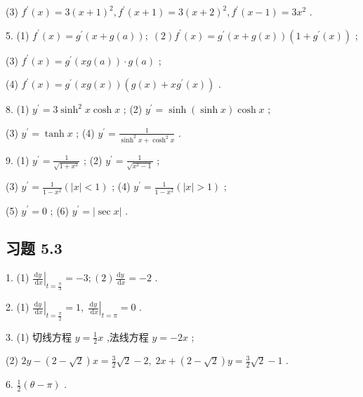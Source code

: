 (3) \({f}^{\prime }\left( x\right)  = 3{\left( x + 1\right) }^{2},{f}^{\prime }\left( {x + 1}\right)  = 3{\left( x + 2\right) }^{2},{f}^{\prime }\left( {x - 1}\right)  = 3{x}^{2}\) .

5. (1) \({f}^{\prime }\left( x\right)  = {g}^{\prime }\left( {x + g\left( a\right) }\right) ;\;\left( 2\right) {f}^{\prime }\left( x\right)  = {g}^{\prime }\left( {x + g\left( x\right) }\right) \left( {1 + {g}^{\prime }\left( x\right) }\right)\) ;

(3) \({f}^{\prime }\left( x\right)  = {g}^{\prime }\left( {{xg}\left( a\right) }\right)  \cdot  g\left( a\right)\) ;

(4) \({f}^{\prime }\left( x\right)  = {g}^{\prime }\left( {{xg}\left( x\right) }\right) \left( {g\left( x\right)  + x{g}^{\prime }\left( x\right) }\right)\) .

8. (1) \({y}^{\prime } = 3{\sinh }^{2}x\cosh x\) ; (2) \({y}^{\prime } = \sinh \left( {\sinh x}\right) \cosh x\) ;

(3) \({y}^{\prime } = \tanh x\) ; (4) \({y}^{\prime } = \frac{1}{{\sinh }^{2}x + {\cosh }^{2}x}\) .

9. (1) \({y}^{\prime } = \frac{1}{\sqrt{1 + {x}^{2}}}\) ; (2) \({y}^{\prime } = \frac{1}{\sqrt{{x}^{2} - 1}}\) ;

(3) \({y}^{\prime } = \frac{1}{1 - {x}^{2}}\left( {\left| x\right|  < 1}\right)\) ; (4) \({y}^{\prime } = \frac{1}{1 - {x}^{2}}\left( {\left| x\right|  > 1}\right)\) ;

(5) \({y}^{\prime } = 0\) ; (6) \({y}^{\prime } = \left| {\sec x}\right|\) .

\subsection{习题 5.3}

1. (1) \({\left. \frac{\mathrm{d}y}{\mathrm{\;d}x}\right| }_{t = \frac{\pi }{3}} =  - 3;\left( 2\right) \frac{\mathrm{d}y}{\mathrm{\;d}x} =  - 2\) .

2. (1) \({\left. \frac{\mathrm{d}y}{\mathrm{\;d}x}\right| }_{t = \frac{\pi }{2}} = 1,{\left. \;\frac{\mathrm{d}y}{\mathrm{\;d}x}\right| }_{t = \pi } = 0\) .

3. (1) 切线方程 \(y = \frac{1}{2}x\) ,法线方程 \(y =  - {2x}\) ;

(2) \({2y} - \left( {2 - \sqrt{2}}\right) x = \frac{3}{2}\sqrt{2} - 2,\;{2x} + \left( {2 - \sqrt{2}}\right) y = \frac{3}{2}\sqrt{2} - 1\) .

6. \(\frac{1}{2}\left( {\theta  - \pi }\right)\) .

